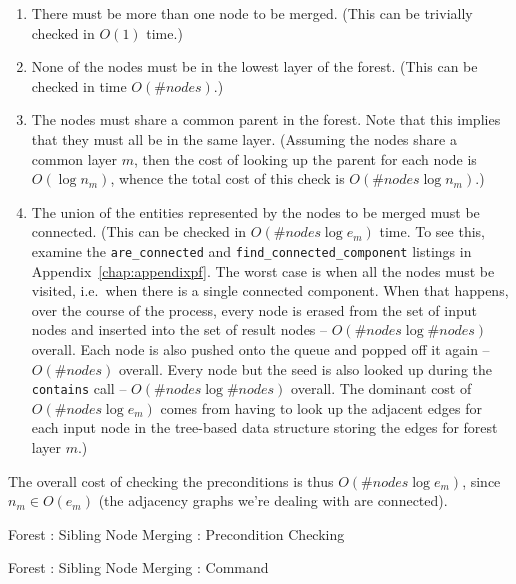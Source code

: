 \begin{enumerate}

\item There must be more than one node to be merged. (This can be trivially checked in $O(1)$ time.)
\item None of the nodes must be in the lowest layer of the forest. (This can be checked in time $O(\#\mathit{nodes})$.)
\item The nodes must share a common parent in the forest. Note that this implies that they must all be in the same layer. (Assuming the nodes share a common layer $m$, then the cost of looking up the parent for each node is $O(\log n_m)$, whence the total cost of this check is $O(\#\mathit{nodes} \log n_m)$.)
\item The union of the entities represented by the nodes to be merged must be connected. (This can be checked in $O(\#\mathit{nodes} \log e_m)$ time. To see this, examine the \texttt{are_connected} and \texttt{find_connected_component} listings in Appendix~\ref{chap:appendixpf}. The worst case is when all the nodes must be visited, i.e.~when there is a single connected component. When that happens, over the course of the process, every node is erased from the set of input nodes and inserted into the set of result nodes -- $O(\#\mathit{nodes} \log \#\mathit{nodes})$ overall. Each node is also pushed onto the queue and popped off it again -- $O(\#\mathit{nodes})$ overall. Every node but the seed is also looked up during the \texttt{contains} call -- $O(\#\mathit{nodes} \log \#\mathit{nodes})$ overall. The dominant cost of $O(\#\mathit{nodes} \log e_m)$ comes from having to look up the adjacent edges for each input node in the tree-based data structure storing the edges for forest layer $m$.)

\end{enumerate}

\noindent The overall cost of checking the preconditions is thus $O(\#\mathit{nodes} \log e_m)$, since $n_m \in O(e_m)$ (the adjacency graphs we're dealing with are connected).

\begin{stulisting}[p]
\caption{Forest : Sibling Node Merging : Precondition Checking}
\label{code:ipfs-forest-mergesiblingnodes}

\end{stulisting}

\begin{stulisting}[p]
\caption{Forest : Sibling Node Merging : Command}
\label{code:ipfs-forest-mergesiblingnodescommand}

\end{stulisting}

